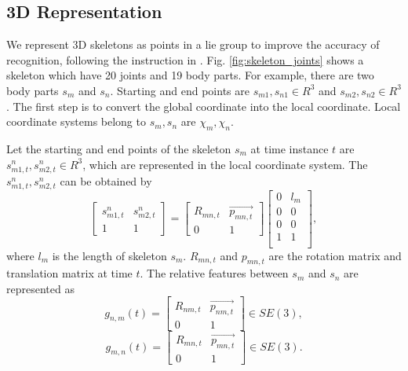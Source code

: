 \documentclass[conference]{IEEEtran}
\begin{document}
	\subsection{3D Representation}
		We represent 3D skeletons as points in a lie group \cite{introduction_on_SE3} to improve the accuracy of recognition, following the instruction in \cite{lie_group}.
		Fig. \ref{fig:skeleton_joints} shows a skeleton which have 20 joints and 19 body parts.
		For example, there are two body parts $ s_{m} $ and $ s_{n} $.
		Starting and end points are $ s_{m1},s_{n1}\in R^3 $ and $ s_{m2},s_{n2}\in R^3 $.
		The first step is to convert the global coordinate into the local coordinate.
		Local coordinate systems belong to $ s_{m},s_{n} $ are $ \chi_{m},\chi_{n} $.
	
		Let the starting and end points of the skeleton $ s_{m} $ at time instance $ t $ are $ s_{m1,t}^n,s_{m2,t}^n\in R^3 $, which are represented in the local coordinate system.
		The $ s_{m1,t}^n,s_{m2,t}^n $ can be obtained by
		\begin{equation}
			\left[
				\begin{array}{cc}
					s_{m1,t}^n & s_{m2,t}^n \\
					1 & 1
				\end{array}
			\right]=\left[
				\begin{array}{cc}
					R_{mn,t} & \vec{p_{mn,t}} \\
					0 & 1
				\end{array}
			\right]\left[
				\begin{array}{cc}
					0 & l_{m} \\
					0 & 0 \\
					0 & 0 \\
					1 & 1 \\
					\end{array}
			\right],
		\end{equation}
		where $ l_{m} $ is the length of skeleton $ s_{m} $.
		$ R_{mn,t} $ and $ p_{mn,t} $ are the rotation matrix and translation matrix at time $ t $.
		The relative features between $ s_{m} $ and $ s_{n} $ are represented as
		\begin{equation}
			g_{n,m}(t)=\left[
			\begin{array}{cc}
			R_{nm,t} & \vec{p_{nm,t}} \\
			0 & 1
			\end{array}
			\right]\in SE(3),
		\end{equation}	
		\begin{equation}
			g_{m,n}(t)=\left[
				\begin{array}{cc}
					R_{mn,t} & \vec{p_{mn,t}} \\
					0 & 1
				\end{array}
			\right]\in SE(3).
		\end{equation}
		
\end{document}
